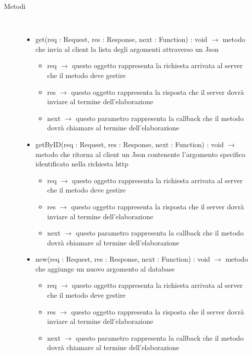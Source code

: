 \begin{description}
\item[Metodi] \hfill \\
\vspace{-7mm}
\begin{itemize}
	\item get(req : Request, res : Response, next : Function) : void $\rightarrow$ metodo che invia al client la lista degli argomenti attraverso un Json\begin{itemize}
		\item req $\rightarrow$ questo oggetto rappresenta la richiesta arrivata al server che il metodo deve gestire
		\item res $\rightarrow$ questo oggetto rappresenta la risposta che il server dovrà inviare al termine dell'elaborazione
		\item next $\rightarrow$ questo parametro rappresenta la callback che il metodo dovrà chiamare al termine dell'elaborazione
	\end{itemize}
	
	\item getByID(req : Request, res : Response, next : Function) : void $\rightarrow$ metodo che ritorna al client un Json contenente l'argomento specifico identificato nella richiesta http\begin{itemize}
		\item req $\rightarrow$ questo oggetto rappresenta la richiesta arrivata al server che il metodo deve gestire
		\item res $\rightarrow$ questo oggetto rappresenta la risposta che il server dovrà inviare al termine dell'elaborazione
		\item next $\rightarrow$ questo parametro rappresenta la callback che il metodo dovrà chiamare al termine dell'elaborazione
	\end{itemize}
	
	\item new(req : Request, res : Response, next : Function) : void $\rightarrow$ metodo che aggiunge un nuovo argomento al database\begin{itemize}
		\item req $\rightarrow$ questo oggetto rappresenta la richiesta arrivata al server che il metodo deve gestire
		\item res $\rightarrow$ questo oggetto rappresenta la risposta che il server dovrà inviare al termine dell'elaborazione
		\item next $\rightarrow$ questo parametro rappresenta la callback che il metodo dovrà chiamare al termine dell'elaborazione
	\end{itemize}
	

\end{itemize}
\end{description}
